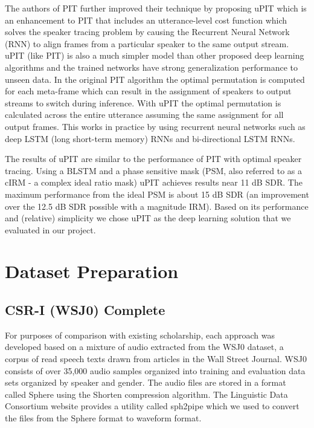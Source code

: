 \documentclass[journal, a4paper]{IEEEtran}
\begin{document}
The authors of PIT further improved their technique by proposing uPIT which is an enhancement to PIT that includes an utterance-level cost function which solves the speaker tracing problem by causing the Recurrent Neural Network (RNN) to align frames from a particular speaker to the same output stream. uPIT (like PIT) is also a much simpler model than other proposed deep learning algorithms and the trained networks have strong generalization performance to unseen data. In the original PIT algorithm the optimal permutation is computed for each meta-frame which can result in the assignment of speakers to output streams to switch during inference. With uPIT the optimal permutation is calculated across the entire utterance assuming the same assignment for all output frames. This works in practice by using recurrent neural networks such as deep LSTM (long short-term memory) RNNs and bi-directional LSTM RNNs.

The results of uPIT are similar to the performance of PIT with optimal speaker tracing. Using a BLSTM and a phase sensitive mask (PSM, also referred to as a cIRM - a complex ideal ratio mask) uPIT achieves results near 11 dB SDR. The maximum performance from the ideal PSM is about 15 dB SDR (an improvement over the 12.5 dB SDR possible with a magnitude IRM). Based on its performance and (relative) simplicity we chose uPIT as the deep learning solution that we evaluated in our project.


\section{Dataset Preparation}
\subsection{CSR-I (WSJ0) Complete}
For purposes of comparison with existing scholarship, each approach was developed based on a mixture of audio extracted from the WSJ0 dataset, a corpus of read speech texts drawn from articles in the Wall Street Journal. WSJ0 \cite{garofolo:wsj0} consists of over 35,000 audio samples organized into training and evaluation data sets organized by speaker and gender. The audio files are stored in a format called Sphere using the Shorten compression algorithm. The Linguistic Data Consortium website provides a  utility called sph2pipe \cite{ldc:sph2pipe} which we used to convert the files from the Sphere format to waveform format.
\end{document}
